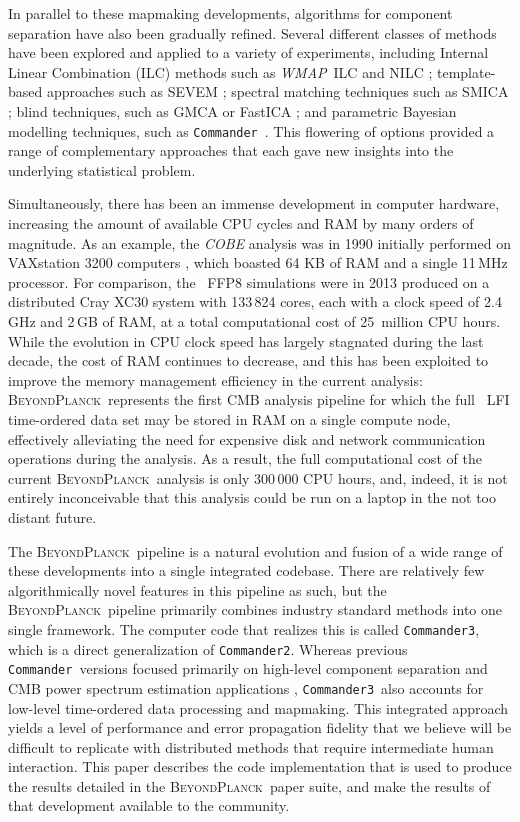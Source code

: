 \documentclass[twocolumn]{aa}
\def\WMAP{\emph{WMAP}}
\def\commander{\texttt{Commander}}
\def\commandertwo{\texttt{Commander2}}
\def\commanderthree{\texttt{Commander3}}
\newcommand{\BP}{\textsc{BeyondPlanck}}
\begin{document}
In parallel to these mapmaking developments, algorithms for component
separation have also been gradually refined. Several different classes of
methods have been explored and applied to a variety of experiments,
including Internal Linear Combination (ILC) methods such as \WMAP\ ILC
\citep{WMAPilc1,WMAPilc2} and NILC \citep{NILC}; template-based
approaches such as SEVEM \citep{SEVEM}; spectral matching techniques
such as SMICA \citep{SMICA}; blind techniques, such as GMCA
\citep{GMCA} or FastICA \citep{fastICA}; and parametric Bayesian
modelling techniques, such as
\commander\ \citep{eriksen:2004,commander,seljebotn:2019}. This
flowering of options provided a range of complementary approaches that
each gave new insights into the underlying statistical problem.

Simultaneously, there has been an immense development in computer
hardware, increasing the amount of available CPU cycles and RAM by
many orders of magnitude. As an example, the \emph{COBE} analysis was
in 1990 initially performed on VAXstation 3200 computers
\citep{cobeprocessing}, which boasted 64 KB of RAM and a single
11\,MHz processor. For comparison, the \Planck\ FFP8 simulations
\citep{planck2014-a14} were in 2013 produced on a distributed Cray
XC30 system with 133\,824 cores, each with a clock speed of 2.4\,GHz
and 2\,GB of RAM, at a total computational cost of 25\, million CPU
hours. While the evolution in CPU clock speed has largely stagnated
during the last decade, the cost of RAM continues to decrease, and
this has been exploited to improve the memory management efficiency in
the current analysis: \BP\ represents the first CMB analysis pipeline
for which the full \Planck\ LFI time-ordered data set may be stored in
RAM on a single compute node, effectively alleviating the need for
expensive disk and network communication operations during the
analysis. As a result, the full computational cost of the current
\BP\ analysis is only 300\,000 CPU hours, and, indeed, it is not
entirely inconceivable that this analysis could be run on a laptop in
the not too distant future.

The \BP\ pipeline is a natural evolution and fusion of a wide range of
these developments into a single integrated codebase. There are
relatively few algorithmically novel features in this pipeline as
such, but the \BP\ pipeline primarily combines industry standard methods
into one single framework. The computer code that realizes this is
called \commanderthree, which is a direct generalization of
\commandertwo. Whereas previous \commander\ versions focused primarily
on high-level component separation and CMB power spectrum estimation
applications \citep{eriksen:2004,eriksen2008,seljebotn:2019},
\commanderthree\ also accounts for low-level time-ordered data
processing and mapmaking. This integrated approach yields a level of
performance and error propagation fidelity that we believe will be
difficult to replicate with distributed methods that require
intermediate human interaction. This paper describes the code
implementation that is used to produce the results detailed in the
\BP\ paper suite, and make the results of that development available
to the community. 
\end{document}
